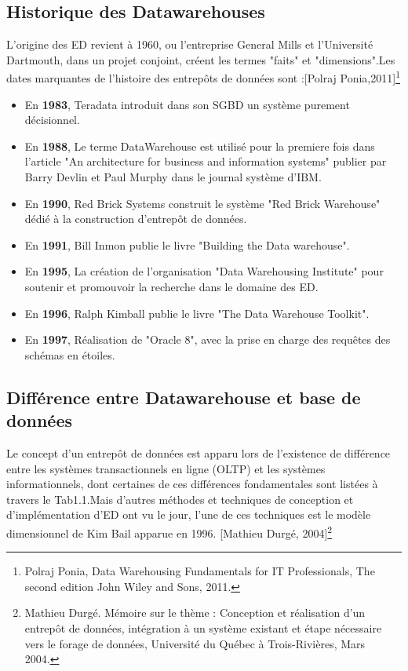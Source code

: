 \subsection{Historique des Datawarehouses}
L’origine des ED revient à 1960, ou l’entreprise General Mills et l’Université Dartmouth, dans un projet conjoint, créent les termes "faits" et "dimensions".Les dates marquantes de l’histoire des entrepôts de données sont :[Polraj Ponia,2011]\footnote{Polraj Ponia, Data Warehousing Fundamentals for IT Professionals, The second edition John Wiley and Sons, 2011.}
\begin{itemize}
    \item En \textbf{1983}, Teradata introduit dans son SGBD un système purement décisionnel.
    \item En \textbf{1988}, Le terme DataWarehouse est utilisé pour la premiere fois dans l’article "An architecture for business and information systems" publier par Barry Devlin et Paul Murphy dans le journal système d’IBM.
    \item En \textbf{1990}, Red Brick Systems construit le système "Red Brick Warehouse" dédié à la construction d’entrepôt de données.
    \item En \textbf{1991}, Bill Inmon publie le livre "Building the Data warehouse".
    \item En \textbf{1995}, La création de l’organisation "Data Warehousing Institute" pour soutenir et promouvoir la recherche dans le domaine des ED.
    \item En \textbf{1996}, Ralph Kimball publie le livre "The Data Warehouse Toolkit".
    \item En \textbf{1997}, Réalisation de "Oracle 8", avec la prise en charge des requêtes des schémas
    en étoiles.
\end{itemize}


\subsection{Différence entre Datawarehouse et base de données}
Le concept d’un entrepôt de données est apparu lors de l’existence de différence entre les systèmes transactionnels en ligne (OLTP) et les systèmes informationnels, dont certaines de ces différences fondamentales sont listées à travers le Tab1.1.Mais d’autres méthodes et techniques de conception et d’implémentation d’ED ont vu le jour, l’une de ces techniques est le modèle dimensionnel de Kim Bail apparue en 1996. [Mathieu Durgé, 2004]\footnote{Mathieu Durgé. Mémoire sur le thème : Conception et réalisation d’un entrepôt de données, intégration à un système existant et étape nécessaire vers le forage de données, Université du Québec à Trois-Rivières, Mars 2004.}

